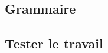 \documentclass[a4paper,10pt]{article}
\begin{document}
\subsection{Grammaire}

\subsection{Tester le travail}
\end{document}
